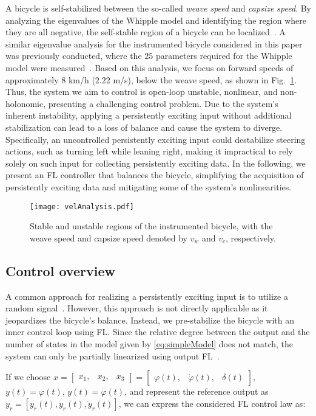 A bicycle is self-stabilized between the so-called \textit{weave speed} and \textit{capsize speed}. By analyzing the eigenvalues of the Whipple model and identifying the region where they are all negative, the self-stable region of a bicycle can be localized~\cite{kooijman2008}. A similar eigenvalue analysis for the instrumented bicycle considered in this paper was previously conducted, where the $25$ parameters required for the Whipple model were measured~\cite{persson2023control}. Based on this analysis, we focus on forward speeds of approximately $8$ km/h ($2.22$ m/s), below the weave speed, as shown in Fig.~\ref{fig:velAnalysis}. Thus, the system we aim to control is open-loop unstable, nonlinear, and non-holonomic, presenting a challenging control problem. Due to the system's inherent instability, applying a persistently exciting input without additional stabilization can lead to a loss of balance and cause the system to diverge. Specifically, an uncontrolled persistently exciting input could destabilize steering actions, such as turning left while leaning right, making it impractical to rely solely on such input for collecting persistently exciting data. In the following, we present an FL controller that balances the bicycle, simplifying the acquisition of persistently exciting data and mitigating some of the system's nonlinearities.

\begin{figure}[t]
    \centering
    \texttt{[image: velAnalysis.pdf]}
    \caption{Stable and unstable regions of the instrumented bicycle, with the weave speed and capsize speed denoted by $v_w$ and $v_c$, respectively.}
    \label{fig:velAnalysis}
\end{figure}

\subsection{Control overview}
A common approach for realizing a persistently exciting input is to utilize a random signal~\cite{alsalti2023design}. However, this approach is not directly applicable as it jeopardizes the bicycle's balance. Instead, we pre-stabilize the bicycle with an inner control loop using FL. Since the relative degree between the output and the number of states in the model given by \eqref{eq:simpleModel} does not match, the system can only be partially linearized using output FL~\cite{slotine1991applied}. 

If we choose $x = \begin{bmatrix}
    x_1, & x_2, & x_3
\end{bmatrix} = \begin{bmatrix}
    \varphi(t), & \dot{\varphi}(t), & \delta(t)
\end{bmatrix}, $ $y(t) = \varphi(t)$, $\dot{y}(t) = \dot{\varphi}(t)$, and represent the reference output as $y_r = [y_r(t), \dot{y}_r(t), \ddot{y}_r(t)]$, we can express the considered FL control law as:

